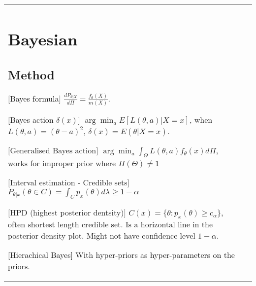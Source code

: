 
\begin{tabulary}{\textwidth}{l || L}

	\section{Bayesian}

	\subsection{Method}

	[Bayes formula]
	$\frac{dP_{\theta|X}}{d\Pi} = \frac{f_\theta(X)}{m(X)}$.

		[Bayes action $\delta(x)$]
	$\arg\min_a E[L(\theta, a) | X = x]$,
	when $L(\theta, a) = (\theta - a)^2$, $\delta(x) = E(\theta | X = x)$.

		[Generalised Bayes action]
	$\arg\min_a \int_{\Theta} L(\theta, a) f_\theta(x) d\Pi$,
	works for improper prior where $\Pi(\Theta) \neq 1$

	[Interval estimation - Credible sets]
	$P_{\theta|x}(\theta\in C) = \int_C p_x(\theta)d\lambda \geq 1- \alpha$

	[HPD (highest posterior dentsity)]
	$C(x) = \{\theta: p_x(\theta) \geq c_\alpha\}$,
	often shortest length credible set.
	Is a horizontal line in the posterior density plot.
	Might not have confidence level $1-\alpha$.

		[Hierachical Bayes]
	With hyper-priors as hyper-parameters on the priors.

\end{tabulary}

